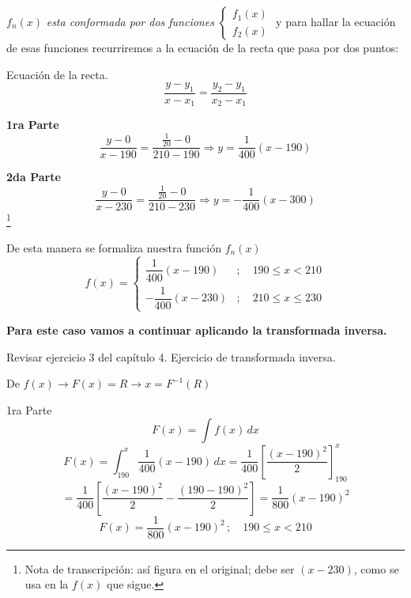 \documentclass[11pt,letterpaper]{report}
\begin{document}
\begin{center}
\end{center}

$f_n(x)$ \textit{esta conformada por dos funciones} $\begin{cases} f_1(x)\\ f_2(x)\end{cases}$ y para hallar la ecuación de esas funciones recurriremos a la ecuación de la recta que pasa por dos puntos:

Ecuación de la recta.
\[
\frac{y - y_1}{x - x_1} = \frac{y_2 - y_1}{x_2 - x_1}
\]

\textbf{1ra Parte} \quad [$(x_1, y_1) = (190, 0)$, $(x_2, y_2) = (210, 1/20)$]
\[
\frac{y - 0}{x - 190} = \frac{\frac{1}{20} - 0}{210 - 190} \Longrightarrow y = \frac{1}{400}(x - 190)
\]

\textbf{2da Parte} \quad [$(x_1, y_1) = (230, 0)$, $(x_2, y_2) = (210, 1/20)$]
\[
\frac{y - 0}{x - 230} = \frac{\frac{1}{20} - 0}{210 - 230} \Longrightarrow y = -\frac{1}{400}(x - 300)
\]
\footnote{Nota de transcripción: así figura en el original; debe ser $(x - 230)$, como se usa en la $f(x)$ que sigue.}

De esta manera se formaliza nuestra función $f_n(x)$
\[
f(x) = \begin{cases}
\dfrac{1}{400}(x - 190) & ;\quad 190 \leq x < 210\\[0.3cm]
-\dfrac{1}{400}(x - 230) & ;\quad 210 \leq x \leq 230
\end{cases}
\]

\textbf{Para este caso vamos a continuar aplicando la transformada inversa.}

Revisar ejercicio 3 del capítulo 4. Ejercicio de transformada inversa.

De $f(x) \rightarrow F(x) = R \rightarrow x = F^{-1}(R)$

1ra Parte
\[
F(x) = \int f(x)\,dx
\]
\[
F(x) = \int_{190}^x \frac{1}{400}(x - 190)\,dx = \frac{1}{400}\left[\frac{(x-190)^2}{2}\right]_{190}^x
\]
\[
= \frac{1}{400}\left[\frac{(x-190)^2}{2} - \frac{(190-190)^2}{2}\right] = \frac{1}{800}(x - 190)^2
\]
\[
\boxed{F(x) = \frac{1}{800}(x - 190)^2\,;\quad 190 \leq x < 210}
\]
\end{document}
